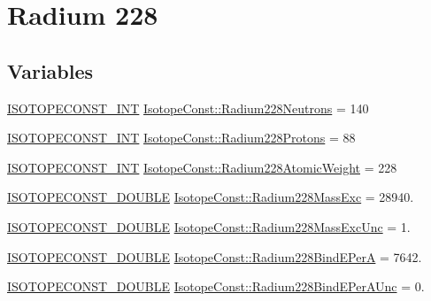 \hypertarget{group___isotope_const-_radium-_ra228}{}\section{Radium 228}
\label{group___isotope_const-_radium-_ra228}
\subsection*{Variables}
\begin{DoxyCompactItemize}
\item 
\mbox{\hyperlink{group___isotope_const-_macros_ga5f18360b3e99483a35c32d789e62621c}{I\+S\+O\+T\+O\+P\+E\+C\+O\+N\+S\+T\+\_\+\+I\+NT}} \mbox{\hyperlink{group___isotope_const-_radium-_ra228_ga63fa8a54b55d65deaf7cd3132d63a1a9}{Isotope\+Const\+::\+Radium228\+Neutrons}} = 140
\item 
\mbox{\hyperlink{group___isotope_const-_macros_ga5f18360b3e99483a35c32d789e62621c}{I\+S\+O\+T\+O\+P\+E\+C\+O\+N\+S\+T\+\_\+\+I\+NT}} \mbox{\hyperlink{group___isotope_const-_radium-_ra228_gae509641c34e64d706c0851ac9124c654}{Isotope\+Const\+::\+Radium228\+Protons}} = 88
\item 
\mbox{\hyperlink{group___isotope_const-_macros_ga5f18360b3e99483a35c32d789e62621c}{I\+S\+O\+T\+O\+P\+E\+C\+O\+N\+S\+T\+\_\+\+I\+NT}} \mbox{\hyperlink{group___isotope_const-_radium-_ra228_ga6725733c3d4dcd85ab81d4a25a9f389b}{Isotope\+Const\+::\+Radium228\+Atomic\+Weight}} = 228
\item 
\mbox{\hyperlink{group___isotope_const-_macros_ga8f45a7272ce02c0b4c65c44636ed719a}{I\+S\+O\+T\+O\+P\+E\+C\+O\+N\+S\+T\+\_\+\+D\+O\+U\+B\+LE}} \mbox{\hyperlink{group___isotope_const-_radium-_ra228_ga0387261ba59385f2b7cadbd030e4d911}{Isotope\+Const\+::\+Radium228\+Mass\+Exc}} = 28940.
\item 
\mbox{\hyperlink{group___isotope_const-_macros_ga8f45a7272ce02c0b4c65c44636ed719a}{I\+S\+O\+T\+O\+P\+E\+C\+O\+N\+S\+T\+\_\+\+D\+O\+U\+B\+LE}} \mbox{\hyperlink{group___isotope_const-_radium-_ra228_gaa6e19ba97be9c4aeff002f59458f9a80}{Isotope\+Const\+::\+Radium228\+Mass\+Exc\+Unc}} = 1.
\item 
\mbox{\hyperlink{group___isotope_const-_macros_ga8f45a7272ce02c0b4c65c44636ed719a}{I\+S\+O\+T\+O\+P\+E\+C\+O\+N\+S\+T\+\_\+\+D\+O\+U\+B\+LE}} \mbox{\hyperlink{group___isotope_const-_radium-_ra228_gaa7e03e07dea08c08e9e32a48353f0387}{Isotope\+Const\+::\+Radium228\+Bind\+E\+PerA}} = 7642.
\item 
\mbox{\hyperlink{group___isotope_const-_macros_ga8f45a7272ce02c0b4c65c44636ed719a}{I\+S\+O\+T\+O\+P\+E\+C\+O\+N\+S\+T\+\_\+\+D\+O\+U\+B\+LE}} \mbox{\hyperlink{group___isotope_const-_radium-_ra228_gafbe73b6ecd44f2e6a8341bba317c4576}{Isotope\+Const\+::\+Radium228\+Bind\+E\+Per\+A\+Unc}} = 0.

\end{DoxyCompactItemize}
